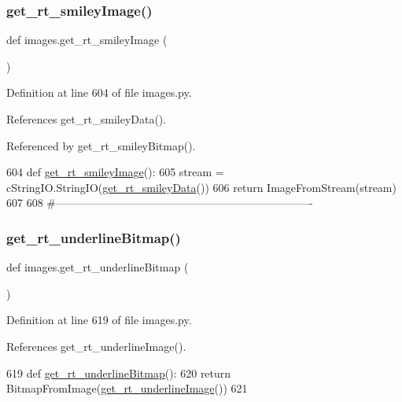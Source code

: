 \subsubsection{\texorpdfstring{get\+\_\+rt\+\_\+smiley\+Image()}{get\_rt\_smileyImage()}}
{\footnotesize\ttfamily def images.\+get\+\_\+rt\+\_\+smiley\+Image (\begin{DoxyParamCaption}{ }\end{DoxyParamCaption})}



Definition at line 604 of file images.\+py.



References get\+\_\+rt\+\_\+smiley\+Data().



Referenced by get\+\_\+rt\+\_\+smiley\+Bitmap().


\begin{DoxyCode}
604 \textcolor{keyword}{def }\hyperlink{namespaceimages_a80f5f18c45716de64354e8a3cd06e245}{get\_rt\_smileyImage}():
605     stream = cStringIO.StringIO(\hyperlink{namespaceimages_ab452e2b655beaf7b1c1f5d07e28913ad}{get\_rt\_smileyData}())
606     \textcolor{keywordflow}{return} ImageFromStream(stream)
607 
608 \textcolor{comment}{#----------------------------------------------------------------------}
\end{DoxyCode}
\mbox{\label{namespaceimages_a4bac511a6eeeb2127ebac98d0dcd14e0}} 
\subsubsection{\texorpdfstring{get\+\_\+rt\+\_\+underline\+Bitmap()}{get\_rt\_underlineBitmap()}}
{\footnotesize\ttfamily def images.\+get\+\_\+rt\+\_\+underline\+Bitmap (\begin{DoxyParamCaption}{ }\end{DoxyParamCaption})}



Definition at line 619 of file images.\+py.



References get\+\_\+rt\+\_\+underline\+Image().


\begin{DoxyCode}
619 \textcolor{keyword}{def }\hyperlink{namespaceimages_a4bac511a6eeeb2127ebac98d0dcd14e0}{get\_rt\_underlineBitmap}():
620     \textcolor{keywordflow}{return} BitmapFromImage(\hyperlink{namespaceimages_ac79f659a15f37cc800164b1aa57da45a}{get\_rt\_underlineImage}())
621 
\end{DoxyCode}
\mbox{\label{namespaceimages_a016500491499878fd6993077288fadc0}} 
